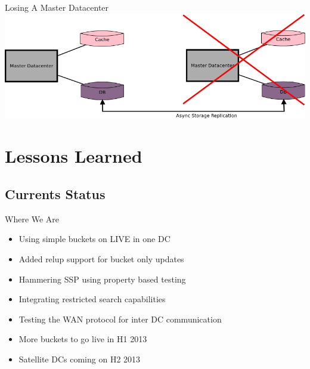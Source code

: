 \documentclass[aspectratio=169]{beamer}
\begin{document}
\begin{frame}{Losing A Master Datacenter}
    \includegraphics[width=\textwidth]{images/lostmasterdchope.png}
\end{frame}

\section{Lessons Learned}

\subsection{Currents Status}
\begin{frame}{Where We Are}
    \begin{itemize}
        \item Using simple buckets on LIVE in one DC
        \item Added relup support for bucket only updates
        \item Hammering SSP using property based testing
        \item Integrating restricted search capabilities
        \item Testing the WAN protocol for inter DC communication
        \item More buckets to go live in H1 2013
        \item Satellite DCs coming on H2 2013
    \end{itemize}
\end{frame}
\end{document}
